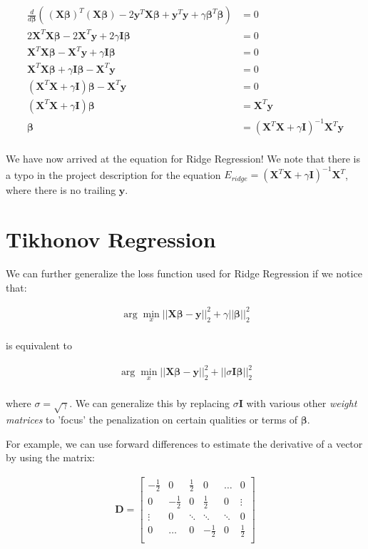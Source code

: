 \documentclass{article}
\newcommand{\y}{\mathbf{y}}
\newcommand{\X}{\mathbf{X}}
\newcommand{\B}{\boldsymbol\beta} %
\newcommand{\I}{\mathbf{I}}
\newcommand{\D}{\mathbf{D}}
\begin{document}
\begin{equation}
\begin{split}
    \frac{d}{d \B} (\frac{}{}(\X\B)^T(\X\B) -2 \y^T \X\B + \y^T \y + \gamma \B^T \B) &= 0 \\
    2 \X ^T \X \B - 2 \X ^T \y + 2 \gamma \I \B &= 0 \\
    \X ^T \X \B - \X ^T \y + \gamma \I \B &= 0 \\
    \X ^T \X \B + \gamma \I \B - \X ^T \y &= 0 \\
    ( \X ^T \X + \gamma \I ) \B - \X ^T \y &= 0 \\
    ( \X ^T \X + \gamma \I ) \B  &= \X ^T \y \\
    \B &= ( \X ^T \X + \gamma \I )^{-1} \X ^T \y  \\
\end{split}
\end{equation}

We have now arrived at the equation for Ridge Regression! We note that there is a typo in the project description for the equation $E_{ridge}=( \X ^T \X + \gamma \I )^{-1} \X ^T$, where there is no trailing $\y$.

\section{Tikhonov Regression}
We can further generalize the loss function used for Ridge Regression if we notice that:


\begin{align*}
\arg \min_{x} ||\X\B-\y||_{2}^{2} + \gamma||\B||_{2}^{2} \\
\end{align*}


is equivalent to 


\begin{align*}
\arg \min_{x} ||\X\B-\y||_{2}^{2} + ||\sigma \I \B||_{2}^{2} \\
\end{align*}

where $\sigma = \sqrt{\gamma}$. We can generalize this by replacing $\sigma \I $ with various other \emph{weight matrices} to 'focus' the penalization on certain qualities or terms of $\B$. 

For example, we can use forward differences to estimate the derivative of a vector by using the matrix:

\begin{align*}
  \D = \begin{bmatrix}
    -\frac{1}{2} & 0 & \frac{1}{2} & 0 & \dots & 0 \\
    0 & -\frac{1}{2} & 0 & \frac{1}{2} & 0 & \vdots \\
    \vdots & 0 & \ddots & \ddots & \ddots & 0 \\
    0 & \dots & 0 & -\frac{1}{2} & 0 & \frac{1}{2} \\ 
  \end{bmatrix}\\
\end{align*}
\end{document}
